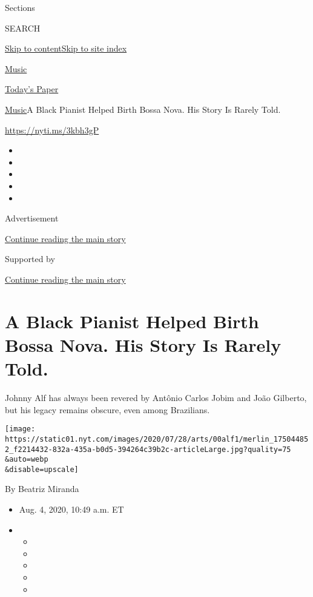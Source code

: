 Sections

SEARCH

\protect\hyperlink{site-content}{Skip to
content}\protect\hyperlink{site-index}{Skip to site index}

\href{https://www.nytimes.com/section/arts/music}{Music}

\href{https://myaccount.nytimes.com/auth/login?response_type=cookie\&client_id=vi}{}

\href{https://www.nytimes.com/section/todayspaper}{Today's Paper}

\href{/section/arts/music}{Music}\textbar{}A Black Pianist Helped Birth
Bossa Nova. His Story Is Rarely Told.

\url{https://nyti.ms/3kbh3gP}

\begin{itemize}
\item
\item
\item
\item
\item
\end{itemize}

Advertisement

\protect\hyperlink{after-top}{Continue reading the main story}

Supported by

\protect\hyperlink{after-sponsor}{Continue reading the main story}

\hypertarget{a-black-pianist-helped-birth-bossa-nova-his-story-is-rarely-told}{%
\section{A Black Pianist Helped Birth Bossa Nova. His Story Is Rarely
Told.}\label{a-black-pianist-helped-birth-bossa-nova-his-story-is-rarely-told}}

Johnny Alf has always been revered by Antônio Carlos Jobim and João
Gilberto, but his legacy remains obscure, even among Brazilians.

\texttt{[image: https://static01.nyt.com/images/2020/07/28/arts/00alf1/merlin\_175044852\_f2214432-832a-435a-b0d5-394264c39b2c-articleLarge.jpg?quality=75\\\&auto=webp\\\&disable=upscale]}

By Beatriz Miranda

\begin{itemize}
\item
  Aug. 4, 2020, 10:49 a.m. ET
\item
  \begin{itemize}
  \item
  \item
  \item
  \item
  \item
  \end{itemize}
\end{itemize}

